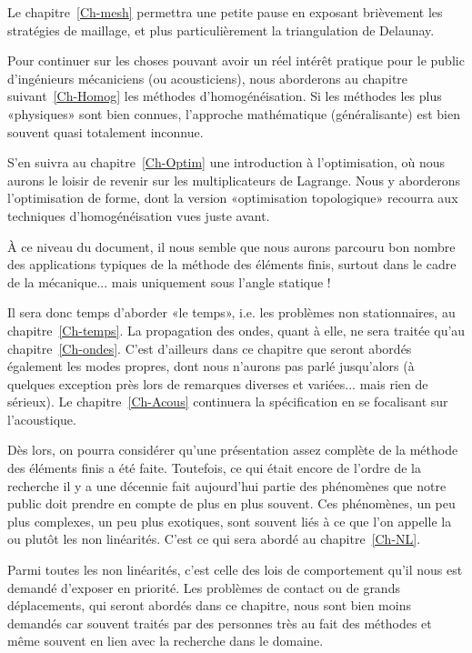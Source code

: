 \medskip
Le chapitre~\ref{Ch-mesh} permettra une petite pause en exposant brièvement les stratégies de maillage, et plus particulièrement la triangulation de Delaunay.

\medskip
Pour continuer sur les choses pouvant avoir un réel intérêt pratique pour le public d'ingénieurs mécaniciens (ou acousticiens), nous aborderons au chapitre suivant~\ref{Ch-Homog} les méthodes d'homogénéisation.
Si les méthodes les plus «physiques» sont bien connues, l'approche mathématique (généralisante) est bien souvent quasi totalement inconnue.

\medskip
S'en suivra au chapitre~\ref{Ch-Optim} une introduction à l'optimisation, où nous aurons le loisir de revenir sur les multiplicateurs de Lagrange. Nous y aborderons l'optimisation de forme, dont la version «optimisation topologique» recourra aux techniques d'homogénéisation vues juste avant.

\medskip
À ce niveau du document, il nous semble que nous aurons parcouru bon nombre des applications typiques de la méthode des éléments finis, surtout dans le cadre de la mécanique... mais uniquement sous l'angle statique !

Il sera donc temps d'aborder «le temps», i.e. les problèmes non stationnaires, au chapitre~\ref{Ch-temps}.
La propagation des ondes, quant à elle, ne sera traitée qu'au chapitre~\ref{Ch-ondes}. C'est d'ailleurs dans ce chapitre que seront abordés également les modes propres, dont nous n'aurons pas parlé jusqu'alors (à quelques exception près lors de remarques diverses et variées... mais rien de sérieux). Le chapitre~\ref{Ch-Acous} continuera la spécification en se focalisant sur l'acoustique.

\medskip
Dès lors, on pourra considérer qu'une présentation assez complète de la méthode des éléments finis a été faite. Toutefois, ce qui était encore de l'ordre de la recherche il y a une décennie fait aujourd'hui partie des phénomènes que notre public doit prendre en compte de plus en plus souvent. Ces phénomènes, un peu plus complexes, un peu plus exotiques, sont souvent liés à ce que l'on appelle la ou plutôt les non linéarités. C'est ce qui sera abordé au chapitre~\ref{Ch-NL}.

Parmi toutes les non linéarités, c'est celle des lois de comportement qu'il nous est demandé d'exposer en priorité. Les problèmes de contact ou de grands déplacements, qui seront abordés dans ce chapitre, nous sont bien moins demandés car souvent traités par des personnes très au fait des méthodes et même souvent en lien avec la recherche dans le domaine.

